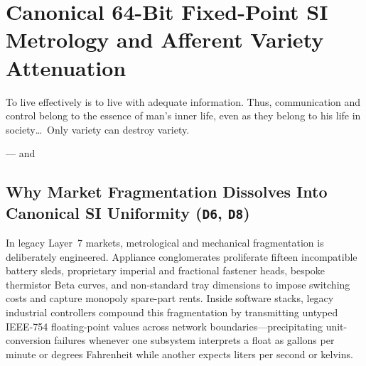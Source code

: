 \chapter{Canonical 64-Bit Fixed-Point SI Metrology and Afferent Variety Attenuation}
\label{ch:canonical-si-metrology}

\epigraph{To live effectively is to live with adequate information. Thus, communication and control belong to the essence of man's inner life, even as they belong to his life in society\dots\ Only variety can destroy variety.}{--- \textcite{wiener1954} and \textcite{ashby1956}}

\section{Why Market Fragmentation Dissolves Into Canonical SI Uniformity (\texttt{D6}, \texttt{D8})}
\label{sec:l2-two-zone-metrology}

In legacy Layer~7 markets, metrological and mechanical fragmentation is deliberately engineered. Appliance conglomerates proliferate fifteen incompatible battery sleds, proprietary imperial and fractional fastener heads, bespoke thermistor Beta curves, and non-standard tray dimensions to impose switching costs and capture monopoly spare-part rents. Inside software stacks, legacy industrial controllers compound this fragmentation by transmitting untyped IEEE-754 floating-point values across network boundaries---precipitating unit-conversion failures whenever one subsystem interprets a float as gallons per minute or degrees Fahrenheit while another expects liters per second or kelvins.

